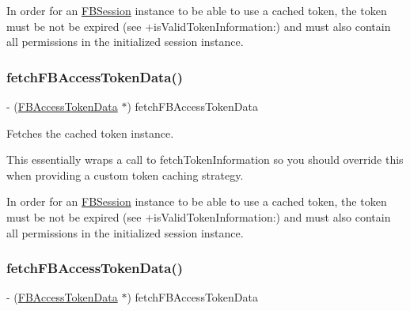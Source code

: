 In order for an {\ttfamily \hyperlink{interfaceFBSession}{F\+B\+Session}} instance to be able to use a cached token, the token must be not be expired (see {\ttfamily +is\+Valid\+Token\+Information\+:}) and must also contain all permissions in the initialized session instance. \mbox{\label{interfaceFBSessionTokenCachingStrategy_a7378a3d9006864d343e086bbfbe66948}} 
\subsubsection{\texorpdfstring{fetch\+F\+B\+Access\+Token\+Data()}{fetchFBAccessTokenData()}\hspace{0.1cm}{\footnotesize\ttfamily [2/5]}}
{\footnotesize\ttfamily -\/ (\hyperlink{interfaceFBAccessTokenData}{F\+B\+Access\+Token\+Data} $\ast$) fetch\+F\+B\+Access\+Token\+Data \begin{DoxyParamCaption}{ }\end{DoxyParamCaption}}

Fetches the cached token instance.

This essentially wraps a call to {\ttfamily fetch\+Token\+Information} so you should override this when providing a custom token caching strategy.

In order for an {\ttfamily \hyperlink{interfaceFBSession}{F\+B\+Session}} instance to be able to use a cached token, the token must be not be expired (see {\ttfamily +is\+Valid\+Token\+Information\+:}) and must also contain all permissions in the initialized session instance. \mbox{\label{interfaceFBSessionTokenCachingStrategy_a7378a3d9006864d343e086bbfbe66948}} 
\subsubsection{\texorpdfstring{fetch\+F\+B\+Access\+Token\+Data()}{fetchFBAccessTokenData()}\hspace{0.1cm}{\footnotesize\ttfamily [3/5]}}
{\footnotesize\ttfamily -\/ (\hyperlink{interfaceFBAccessTokenData}{F\+B\+Access\+Token\+Data} $\ast$) fetch\+F\+B\+Access\+Token\+Data \begin{DoxyParamCaption}{ }\end{DoxyParamCaption}}

